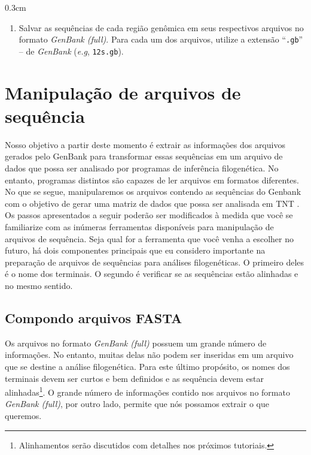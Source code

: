 \begin{refsection}
\begin {myindentpar}{0.3cm}
\begin{enumerate}[\itshape i.]
    \tiny{\textbf{Atenção:} Ao fazer o download do GenBank/NCBI o repositório criará um documento chamado \texttt{sequence.gb} que será salvo no diretório de Download de seu sistema.}
    \normalsize
 
	\item{Salvar as sequências de cada região genômica em seus respectivos arquivos no formato \textit{GenBank (full)}. Para cada um dos arquivos, utilize a extensão ``\texttt{.gb}'' -- de \textit{GenBank} (\textit{e.g}, \texttt{12s.gb}).}
\end{enumerate}
\end{myindentpar}

\section{Manipulação de arquivos de sequência}\label{tut7:handling_files}

Nosso objetivo a partir deste momento é extrair as informações dos arquivos gerados pelo GenBank para transformar essas sequências em um arquivo de dados que possa ser analisado por programas de inferência filogenética. No entanto, programas distintos são capazes de ler arquivos em formatos diferentes. No que se segue, manipularemos os arquivos contendo as sequências do Genbank com o objetivo de gerar uma matriz de dados que possa ser analisada em TNT \parencite{GoloboffEtAl_2008}. Os passos apresentados a seguir poderão ser modificados à medida que você se familiarize com as inúmeras ferramentas disponíveis para manipulação de arquivos de sequência. Seja qual for a ferramenta que você venha a escolher no futuro, há dois componentes principais que eu considero importante na preparação de arquivos de sequências para análises filogenéticas. O primeiro deles é o nome dos terminais. O segundo é verificar se as sequências estão alinhadas e no mesmo sentido.

\subsection{Compondo arquivos FASTA}\label{tut7:handling_files:phyloconvert}

Os arquivos no formato \textit{GenBank (full)} possuem um grande número de informações. No entanto, muitas delas não podem ser inseridas em um arquivo que se destine a análise filogenética. Para este último propósito, os nomes dos terminais devem ser curtos e bem definidos e as sequência devem estar alinhadas\footnote{ Alinhamentos serão discutidos com detalhes nos próximos tutoriais.}. O grande número de informações contido nos arquivos no formato \textit{GenBank (full)}, por outro lado, permite que nós possamos extrair o que queremos.\\


\end{refsection}
